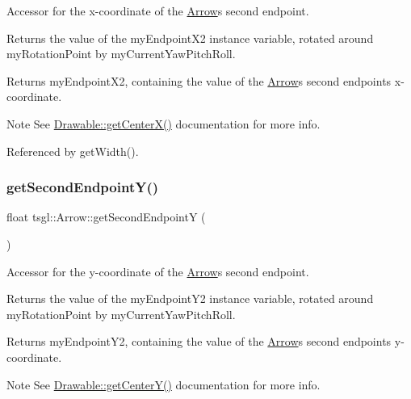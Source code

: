 Accessor for the x-\/coordinate of the \hyperlink{classtsgl_1_1_arrow}{Arrow}\textquotesingle{}s second endpoint. 

Returns the value of the my\+Endpoint\+X2 instance variable, rotated around my\+Rotation\+Point by my\+Current\+Yaw\+Pitch\+Roll. \begin{DoxyReturn}{Returns}
my\+Endpoint\+X2, containing the value of the \hyperlink{classtsgl_1_1_arrow}{Arrow}\textquotesingle{}s second endpoint\textquotesingle{}s x-\/coordinate. 
\end{DoxyReturn}
\begin{DoxyNote}{Note}
See \hyperlink{classtsgl_1_1_drawable_a170ce95eaae8b19532420e42e9eb8abf}{Drawable\+::get\+Center\+X()} documentation for more info. 
\end{DoxyNote}


Referenced by get\+Width().

\mbox{\label{classtsgl_1_1_arrow_a512407b73d07ca147c6a94ff933922f7}} 
\subsubsection{\texorpdfstring{get\+Second\+Endpoint\+Y()}{getSecondEndpointY()}}
{\footnotesize\ttfamily float tsgl\+::\+Arrow\+::get\+Second\+EndpointY (\begin{DoxyParamCaption}{ }\end{DoxyParamCaption})}



Accessor for the y-\/coordinate of the \hyperlink{classtsgl_1_1_arrow}{Arrow}\textquotesingle{}s second endpoint. 

Returns the value of the my\+Endpoint\+Y2 instance variable, rotated around my\+Rotation\+Point by my\+Current\+Yaw\+Pitch\+Roll. \begin{DoxyReturn}{Returns}
my\+Endpoint\+Y2, containing the value of the \hyperlink{classtsgl_1_1_arrow}{Arrow}\textquotesingle{}s second endpoint\textquotesingle{}s y-\/coordinate. 
\end{DoxyReturn}
\begin{DoxyNote}{Note}
See \hyperlink{classtsgl_1_1_drawable_ad78d781f078bab0f458892757f100e7f}{Drawable\+::get\+Center\+Y()} documentation for more info. 
\end{DoxyNote}


